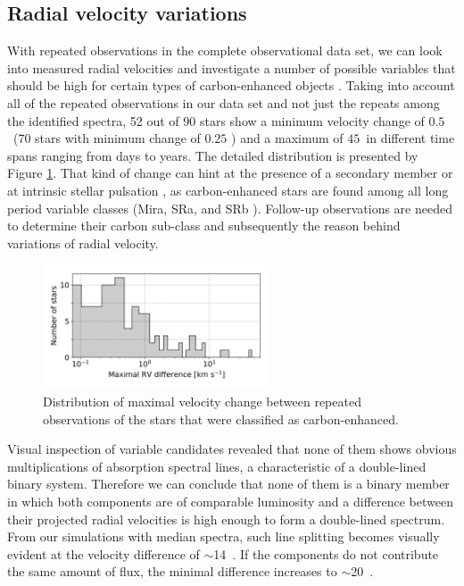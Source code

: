 \subsection{Radial velocity variations}
\label{sec:binaries}
With repeated observations in the complete observational data set, we can look into measured radial velocities and investigate a number of possible variables that should be high for certain types of carbon-enhanced objects \citep{2016ApJ...826...85S}. Taking into account all of the repeated observations in our data set and not just the repeats among the identified spectra, 52 out of 90 stars show a minimum velocity change of $0.5$~\kms (70 stars with minimum change of $0.25$ \kms) and a maximum of $45$~\kms in different time spans ranging from days to years. The detailed distribution is presented by Figure \ref{fig:rv_rep_dist}. That kind of change can hint at the presence of a secondary member or at intrinsic stellar pulsation \citep{2002AA...390..987B, 2010JApA...31..177L, 2012A&A...544A..10B}, as carbon-enhanced stars are found among all long period variable classes (Mira, SRa, and SRb  \cite{2013A&A...553A..93B, 2014A&A...568A.100B}). Follow-up observations are needed to determine their carbon sub-class and subsequently the reason behind variations of radial velocity.

\begin{figure}
	\centering
	\includegraphics[width=0.6\textwidth]{rv_rep_dist.png}
	\caption{Distribution of maximal velocity change between repeated observations of the stars that were classified as carbon-enhanced.}
	\label{fig:rv_rep_dist}
\end{figure}

Visual inspection of variable candidates revealed that none of them shows obvious multiplications of absorption spectral lines, a characteristic of a double-lined binary system. Therefore we can conclude that none of them is a binary member in which both components are of comparable luminosity and a difference between their projected radial velocities is high enough to form a double-lined spectrum. From our simulations with median spectra, such line splitting becomes visually evident at the velocity difference of $\sim$14~\kms. If the components do not contribute the same amount of flux, the minimal difference increases to $\sim$20~\kms.

